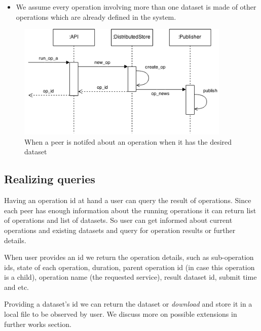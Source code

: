 \begin{itemize}
\item We assume every operation involving more than one dataset is made of
other operations which are already defined in the system.
\end{itemize}

\begin{figure}[h]
  \centering
  \includegraphics[width=4in]{poster/figures/kseq.png}
  \caption[Sequence diagram showing arrival of an operation message]
   {When a peer is notifed about an operation when it has the desired dataset}
\end{figure}

\subsection{Realizing queries}
Having an operation id at hand a user can query the result of operations. 
Since each peer has enough information about the running operations it can return list of operations and list of datasets.
So user can get informed about current operations and existing datasets and query for operation results or further details.

When user provides an id we return the operation details, such as sub-operation ids, state of each operation,
duration, parent operation id (in case this operation is a child), operation name (the requested service), 
result dataset id, submit time and etc.

Providing a dataset's id we can return the dataset or \textit{download} and store it in a local file to be observed by user.
We discuss more on possible extensions in further works section.
